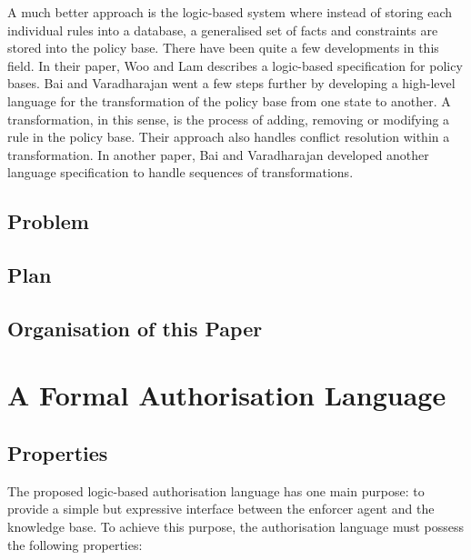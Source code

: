 \documentclass[a4paper]{article}
\begin{document}
      A much better approach is the logic-based system where instead of
      storing each individual rules into a database, a generalised set of
      facts and constraints are stored into the policy base. There have been
      quite a few developments in this field. In their paper, Woo and Lam
      \cite{WL} describes a logic-based specification for policy bases. Bai and
      Varadharajan \cite{BV1} went a few steps further by developing a
      high-level language for the transformation of the policy base from one
      state to another. A transformation, in this sense, is the process of
      adding, removing or modifying a rule in the policy base. Their approach
      also handles conflict resolution within a transformation. In another
      paper, Bai and Varadharajan \cite{BV2} developed another language
      specification to handle sequences of transformations.

    \subsection{Problem}

    \subsection{Plan}

    \subsection{Organisation of this Paper}

    \pagebreak

  \section{A Formal Authorisation Language}

    \subsection{Properties}

      The proposed logic-based authorisation language has one main purpose:
      to provide a simple but expressive interface between the enforcer
      agent and the knowledge base. To achieve this purpose, the authorisation
      language must possess the following properties:
\end{document}
